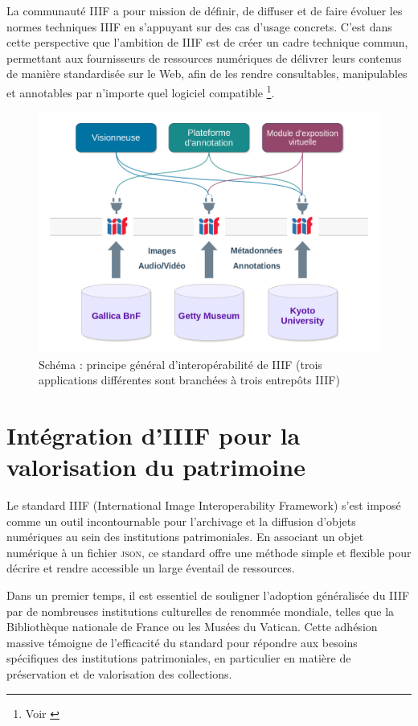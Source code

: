     La communauté IIIF a pour mission de définir, de diffuser et de faire évoluer les normes techniques IIIF en s'appuyant sur des cas d'usage concrets. C'est dans cette perspective que l'ambition de IIIF est de créer un cadre technique commun, permettant aux fournisseurs de ressources numériques de délivrer leurs contenus de manière standardisée sur le Web, afin de les rendre consultables, manipulables et annotables par n'importe quel logiciel compatible \footnote{Voir \cite{biblissima_iiif_intro}}.

        \begin{figure}[h!]
            \centering
            \includegraphics[width=12cm]{02_images/part_01/09_schema_iiif.png}
            \caption{Schéma : principe général d’interopérabilité de IIIF (trois applications différentes sont branchées à trois entrepôts IIIF)}
        \end{figure}
     
    \section{Intégration d'IIIF pour la valorisation du patrimoine}
    
    Le standard IIIF (International Image Interoperability Framework) s'est imposé comme un outil incontournable pour l'archivage et la diffusion d'objets numériques au sein des institutions patrimoniales. En associant un objet numérique à un fichier \textsc{json}, ce standard offre une méthode simple et flexible pour décrire et rendre accessible un large éventail de ressources.

    Dans un premier temps, il est essentiel de souligner l'adoption généralisée du IIIF par de nombreuses institutions culturelles de renommée mondiale, telles que la Bibliothèque nationale de France ou les Musées du Vatican. Cette adhésion massive témoigne de l'efficacité du standard pour répondre aux besoins spécifiques des institutions patrimoniales, en particulier en matière de préservation et de valorisation des collections.
    
